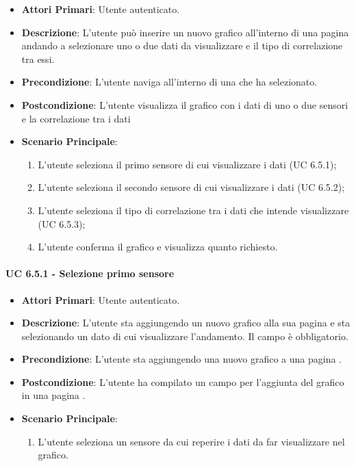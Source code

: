 			\begin{itemize}
				\item \textbf{Attori Primari}: Utente autenticato.
				\item \textbf{Descrizione}: L'utente può inserire un nuovo grafico all'interno di una pagina  andando a selezionare uno o due dati da visualizzare e il tipo di correlazione tra essi.
				\item \textbf{Precondizione}: L'utente naviga all'interno di una  che ha selezionato.
				\item \textbf{Postcondizione}: L'utente visualizza il grafico con i dati di uno o due sensori e la correlazione tra i dati
				\item \textbf{Scenario Principale}:
				\begin{enumerate}
					\item{L'utente seleziona il primo sensore di cui visualizzare i dati (UC 6.5.1);}
					\item{L'utente seleziona il secondo sensore di cui visualizzare i dati (UC 6.5.2);}
					\item{L'utente seleziona il tipo di correlazione tra i dati che intende visualizzare (UC 6.5.3);}
					\item{L'utente conferma il grafico e visualizza quanto richiesto.}
				\end{enumerate}	
			\end{itemize}

			\paragraph{UC 6.5.1 - Selezione primo sensore}
			\begin{itemize}
				\item \textbf{Attori Primari}: Utente autenticato.
				\item \textbf{Descrizione}: L'utente sta aggiungendo un nuovo grafico alla sua pagina  e sta selezionando un dato di cui visualizzare l'andamento. Il campo è obbligatorio.
				\item \textbf{Precondizione}: L'utente sta aggiungendo una nuovo grafico a una pagina .
				\item \textbf{Postcondizione}: L'utente ha compilato un campo per l'aggiunta del grafico in una pagina .
				\item \textbf{Scenario Principale}:
				\begin{enumerate}
					\item{L'utente seleziona un sensore da cui reperire i dati da far visualizzare nel grafico.}
				\end{enumerate}	
			\end{itemize}

